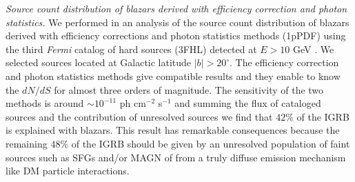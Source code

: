 \documentclass[12 pt]{article}
\begin{document}




{\it Source count distribution of blazars derived with efficiency correction and photon statistics.}
We performed in \cite{DiMauro:2017ing} an analysis of the source count distribution of blazars derived with efficiency corrections and photon statistics methods (1pPDF) using the third {\it Fermi} catalog of hard sources (3FHL) detected at $E>10$ GeV \cite{TheFermi-LAT:2017pvy}. We selected sources located at Galactic latitude $|b|>20^{\circ}$.
The efficiency correction and photon statistics methods give compatible results and they enable to know the $dN/dS$ for almost three orders of magnitude. The sensitivity of the two methods is around $\sim 10^{-11}$ ph cm$^{-2}$ s$^{-1}$ and summing the flux of cataloged sources and the contribution of unresolved sources we find that $42\%$ of the IGRB is explained with blazars. 
This result has remarkable consequences because the remaining $48\%$ of the IGRB should be given by an unresolved population of faint sources such as SFGs and/or MAGN of from a truly diffuse emission mechanism like DM particle interactions. 
\end{document}

